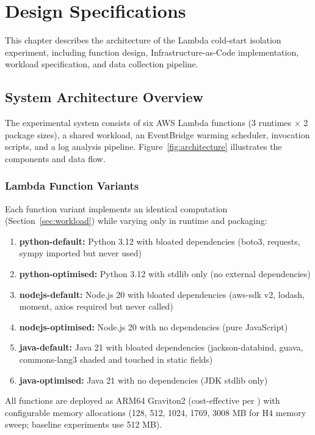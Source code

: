 \chapter{Design Specifications}
\label{ch:design}

This chapter describes the architecture of the Lambda cold-start isolation experiment, including function design, Infrastructure-as-Code implementation, workload specification, and data collection pipeline.

\section{System Architecture Overview}

The experimental system consists of six AWS Lambda functions (3 runtimes × 2 package sizes), a shared workload, an EventBridge warming scheduler, invocation scripts, and a log analysis pipeline. Figure~\ref{fig:architecture} illustrates the components and data flow.


\subsection{Lambda Function Variants}

Each function variant implements an identical computation (Section~\ref{sec:workload}) while varying only in runtime and packaging:

\begin{enumerate}
    \item \textbf{python-default:} Python 3.12 with bloated dependencies (boto3, requests, sympy imported but never used)
    \item \textbf{python-optimised:} Python 3.12 with stdlib only (no external dependencies)
    \item \textbf{nodejs-default:} Node.js 20 with bloated dependencies (aws-sdk v2, lodash, moment, axios required but never called)
    \item \textbf{nodejs-optimised:} Node.js 20 with no dependencies (pure JavaScript)
    \item \textbf{java-default:} Java 21 with bloated dependencies (jackson-databind, guava, commons-lang3 shaded and touched in static fields)
    \item \textbf{java-optimised:} Java 21 with no dependencies (JDK stdlib only)
\end{enumerate}

All functions are deployed as ARM64 Graviton2 (cost-effective per \citet{bluemke2025ijet}) with configurable memory allocations (128, 512, 1024, 1769, 3008 MB for H4 memory sweep; baseline experiments use 512 MB).

